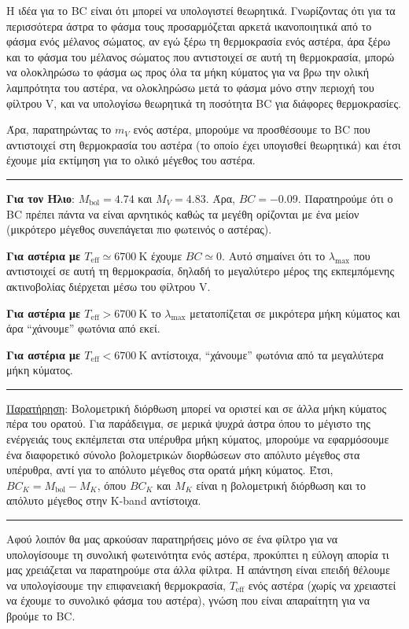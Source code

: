 Η ιδέα για το BC είναι ότι {\color{blue}μπορεί να υπολογιστεί θεωρητικά}. Γνωρίζοντας ότι για τα περισσότερα άστρα το φάσμα τους προσαρμόζεται αρκετά ικανοποιητικά από το φάσμα ενός μέλανος σώματος, αν εγώ ξέρω τη θερμοκρασία ενός αστέρα, άρα ξέρω και το φάσμα του μέλανος σώματος που αντιστοιχεί σε αυτή τη θερμοκρασία, μπορώ να ολοκληρώσω το φάσμα ως προς όλα τα μήκη κύματος για να βρω την ολική λαμπρότητα του αστέρα, να ολοκληρώσω μετά το φάσμα μόνο στην περιοχή του φίλτρου V, και να υπολογίσω θεωρητικά τη ποσότητα BC για διάφορες θερμοκρασίες.

Άρα, παρατηρώντας το $m_V$ ενός αστέρα, μπορούμε να προσθέσουμε το BC που αντιστοιχεί στη θερμοκρασία του αστέρα (το οποίο έχει υπογισθεί θεωρητικά) και έτσι έχουμε μία εκτίμηση για το ολικό μέγεθος του αστέρα.
\\
{\color{red} \hrule}
\textbf{Για τον Ήλιο}: $M_{\text{bol}} = 4.74$ και $M_V = 4.83$. Άρα, $BC = -0.09$.
Παρατηρούμε ότι ο BC πρέπει πάντα να είναι αρνητικός καθώς τα μεγέθη ορίζονται με ένα μείον (μικρότερο μέγεθος συνεπάγεται πιο φωτεινός ο αστέρας).

\textbf{Για αστέρια με $T_{\text{eff}} \simeq 6700 \ \text{K}$} έχουμε $BC \simeq 0$. Αυτό σημαίνει ότι το $\lambda_{\text{max}}$ που αντιστοιχεί σε αυτή τη θερμοκρασία, δηλαδή το μεγαλύτερο μέρος της εκπεμπόμενης ακτινοβολίας διέρχεται μέσω του φίλτρου V.

\textbf{Για αστέρια με $T_{\text{eff}} > 6700 \ \text{K}$} το $\lambda_{\text{max}}$ μετατοπίζεται σε μικρότερα μήκη κύματος και άρα ``χάνουμε'' φωτόνια από εκεί.

\textbf{Για αστέρια με $T_{\text{eff}} < 6700 \ \text{K}$} αντίστοιχα, ``χάνουμε'' φωτόνια από τα μεγαλύτερα μήκη κύματος.
{\color{red} \hrule}

\underline{Παρατήρηση}: Βολομετρική διόρθωση μπορεί να οριστεί και σε άλλα μήκη κύματος πέρα του ορατού. Για παράδειγμα, σε μερικά ψυχρά άστρα όπου το μέγιστο της ενέργειάς τους εκπέμπεται στα υπέρυθρα μήκη κύματος, μπορούμε να εφαρμόσουμε ένα διαφορετικό σύνολο βολομετρικών διορθώσεων στο απόλυτο μέγεθος στα υπέρυθρα, αντί για το απόλυτο μέγεθος στα ορατά μήκη κύματος. Έτσι, $BC_K = M_{\text{bol}} - M_K$, όπου $BC_K$ και $M_K$ είναι η βολομετρική διόρθωση και το απόλυτο μέγεθος στην K-band αντίστοιχα.  
\hrule

Αφού λοιπόν θα μας αρκούσαν παρατηρήσεις μόνο σε ένα φίλτρο για να υπολογίσουμε τη συνολική φωτεινότητα ενός αστέρα, προκύπτει η εύλογη απορία τι μας χρειάζεται να παρατηρούμε στα άλλα φίλτρα. Η απάντηση είναι επειδή θέλουμε να υπολογίσουμε την επιφανειακή θερμοκρασία, $T_{\text{eff}}$ ενός αστέρα (χωρίς να χρειαστεί να έχουμε το συνολικό φάσμα του αστέρα), γνώση που είναι απαραίτητη για να βρούμε το BC.

